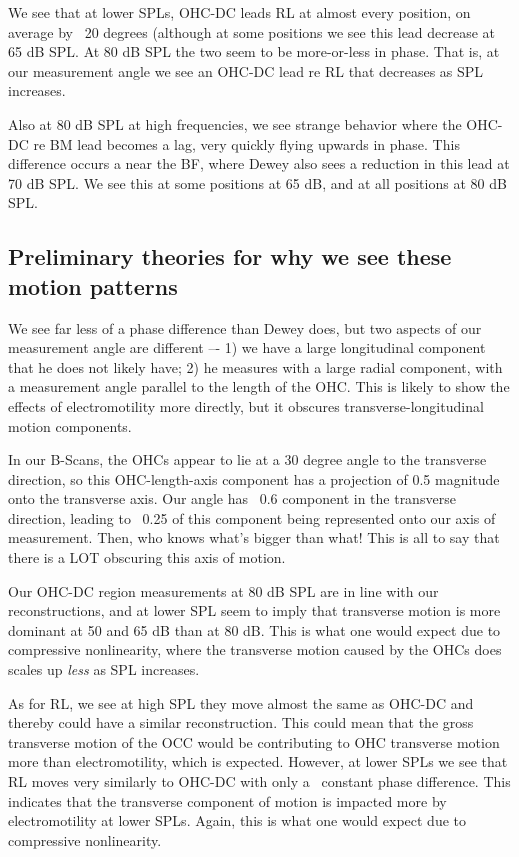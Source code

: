 \documentclass{article}
\begin{document}
\par{We see that at lower SPLs, OHC-DC leads RL at almost every position, on average by ~20 degrees (although at some positions we see this lead decrease at 65 dB SPL. At 80 dB SPL the two seem to be more-or-less in phase. That is, at our measurement angle we see an OHC-DC lead re RL that decreases as SPL increases.}
\par{Also at 80 dB SPL at high frequencies, we see strange behavior where the OHC-DC re BM lead becomes a lag, very quickly flying upwards in phase. This difference occurs a near the BF, where Dewey also sees a reduction in this lead at 70 dB SPL. We see this at some positions at 65 dB, and at all positions at 80 dB SPL.}
\subsection{Preliminary theories for why we see these motion patterns}
\par{We see far less of a phase difference than Dewey does, but two aspects of our measurement angle are different –- 1) we have a large longitudinal component that he does not likely have; 2) he measures with a large radial component, with a measurement angle parallel to the length of the OHC. This is likely to show the effects of electromotility more directly, but it obscures transverse-longitudinal motion components.}
\par{In our B-Scans, the OHCs appear to lie at a 30 degree angle to the transverse direction, so this OHC-length-axis component has a projection of 0.5 magnitude onto the transverse axis. Our angle has ~0.6 component in the transverse direction, leading to ~0.25 of this component being represented onto our axis of measurement. Then, who knows what’s bigger than what! This is all to say that there is a LOT obscuring this axis of motion.}

\par{Our OHC-DC region measurements at 80 dB SPL are in line with our reconstructions, and at lower SPL seem to imply that transverse motion is more dominant at 50 and 65 dB than at 80 dB. This is what one would expect due to compressive nonlinearity, where the transverse motion caused by the OHCs does scales up \textit{less} as SPL increases.}

\par{As for RL, we see at high SPL they move almost the same as OHC-DC and thereby could have a similar reconstruction. This could mean that the gross transverse motion of the OCC would be contributing to OHC transverse motion more than electromotility, which is expected. However, at lower SPLs we see that RL moves very similarly to OHC-DC with only a ~constant phase difference. This indicates that the transverse component of motion is impacted more by electromotility at lower SPLs. Again, this is what one would expect due to compressive nonlinearity.}
\end{document}
